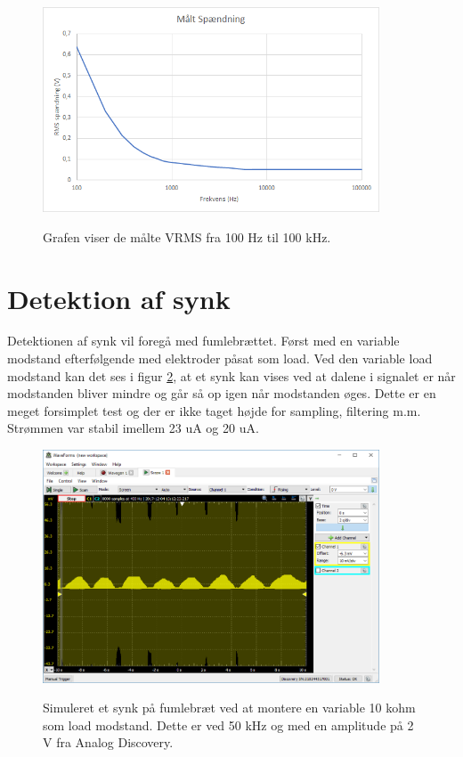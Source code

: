 \begin{figure}[H]
\centering
{\includegraphics[width=10cm]
{Figure/testopstilling1fumlevrmsgraf}}
\caption{Grafen viser de målte VRMS fra 100 Hz til 100 kHz.}
\label{fig:testopstilling1fumlevrmsgraf}
\end{figure}

\section{Detektion af synk}

Detektionen af synk vil foregå med fumlebrættet. Først med en variable modstand efterfølgende med elektroder påsat som load. Ved den variable load modstand kan det ses i figur \ref{fig:10kohmdummysynk}, at et synk kan vises ved at dalene i signalet er når modstanden bliver mindre og går så op igen når modstanden øges. Dette er en meget forsimplet test og der er ikke taget højde for sampling, filtering m.m. Strømmen var stabil imellem 23 uA og 20 uA.

\begin{figure}[H]
\centering
{\includegraphics[width=10cm]
{Figure/10kohmdummysynk}}
\caption{Simuleret et synk på fumlebræt ved at montere en variable 10 kohm som load modstand. Dette er ved 50 kHz og med en amplitude på 2 V fra Analog Discovery.}
\label{fig:10kohmdummysynk}
\end{figure}


